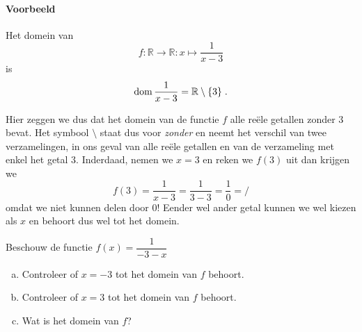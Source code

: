 \documentclass[12pt,twoside]{article}
\begin{document}
\begin{theorie}
\paragraph{Voorbeeld}
Het domein van
$$f:\mathbb{R}\to\mathbb{R}:x\mapsto \dfrac{1}{x-3}$$
is
$$\dom \dfrac{1}{x-3} = \mathbb{R}\setminus\{3\}\;.$$

Hier zeggen we dus dat het domein van de functie $f$ alle reële getallen zonder $3$ bevat. Het symbool $\setminus$ staat dus voor {\em zonder} en neemt het verschil van twee verzamelingen, in ons geval van alle reële getallen en van de verzameling met enkel het getal $3$. Inderdaad, nemen we $x=3$ en reken we $f(3)$ uit dan krijgen we
$$f(3)=\dfrac{1}{x-3}=\dfrac{1}{3-3}=\dfrac{1}{0}=/$$
omdat we niet kunnen delen door $0$! Eender wel ander getal kunnen we wel kiezen als $x$ en behoort dus wel tot het domein.

\end{theorie}

\begin{oefening}
  Beschouw de functie $\displaystyle f(x)=\dfrac{1}{-3-x}$\\
  \begin{enumerate}[(a)]
  \itemsep.5em
  \item Controleer of $x=-3$ tot het domein van $f$ behoort.
  \item Controleer of $x=3$ tot het domein van $f$ behoort.
  \item Wat is het domein van $f$?
  \end{enumerate}
\end{oefening}
\end{document}
